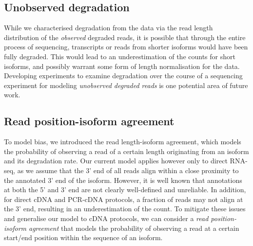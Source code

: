 \subsection{Unobserved degradation}

While we characterised degradation from the data via the read length distribution of the \textit{observed} degraded reads, it is possible that through the entire process of sequencing, transcripts or reads from shorter isoforms would have been fully degraded. This would lead to an underestimation of the counts for short isoforms, and possibly warrant some form of length normalisation for the data. Developing experiments to examine degradation over the course of a sequencing experiment for modeling \textit{unobserved degraded reads} is one potential area of future work.  

\subsection{Read position-isoform agreement}

To model bias, we introduced the read length-isoform agreement, which models the probability of observing a read of a certain length originating from an isoform and its degradation rate. Our current model applies however only to direct RNA-seq, as we assume that the 3' end of all reads align within a close proximity to the annotated 3' end of the isoform. However, it is well known that annotations at both the 5' and 3' end are not clearly well-defined and unreliable. In addition, for direct cDNA and PCR-cDNA protocols, a fraction of reads may not align at the 3' end, resulting in an underestimation of the count. To mitigate these issues and generalise our model to cDNA protocols, we can consider a \textit{read position-isoform agreement} that models the probability of observing a read at a certain start/end position within the sequence of an isoform. 


